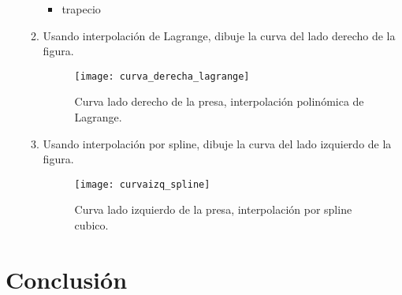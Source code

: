 \documentclass{udpreport}
\begin{document}
\begin{enumerate}
\begin{enumerate}
 
\begin{itemize}
\item trapecio
\end{itemize}

 \vspace{0.8cm}
 
 \item Usando interpolación de Lagrange, dibuje la curva del lado derecho de la  figura.
 
  \begin{figure}[H]
    \centering
    \texttt{[image: curva\_derecha\_lagrange]}
    \caption{Curva lado derecho de la presa, interpolación polinómica de Lagrange.} \label{fig:curva_derecha_lagrange}
  
\end{figure}


 \item Usando interpolación por spline, dibuje la curva del lado izquierdo de la  figura.
 \\
 \begin{figure}[H]
    \centering
    \texttt{[image: curvaizq\_spline]}
    \caption{Curva lado izquierdo de la presa, interpolación por spline cubico.} \label{fig:curvaizq_spline}
\end{figure}

 \end{enumerate}
 \end{enumerate}

\newpage

    
    
\chapter{Conclusión}
\end{document}
